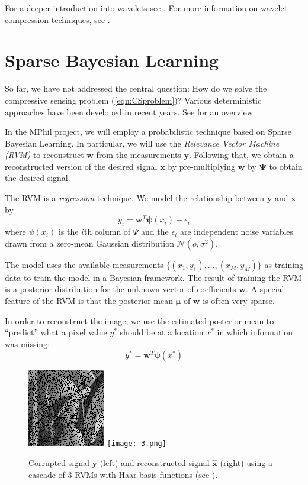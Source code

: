 \documentclass[final,3p]{report}
\let\bs\boldsymbol
\begin{document}
For a deeper introduction into wavelets see \cite{stollnitz1995}.
For more information on wavelet compression techniques, see \cite{devore1992}.

\section{Sparse Bayesian Learning}
So far, we have not addressed the central question: How do we solve the compressive sensing problem (\ref{eqn:CSproblem})?
Various deterministic approaches have been developed in recent years.
See \cite{pilikos2014} for an overview.

In the MPhil project, we will employ a probabilistic technique based on Sparse Bayesian Learning.
In particular, we will use the \emph{Relevance Vector Machine (RVM)} \cite{tipping2001,tipping2003} to reconstruct $\bs w$ from the measurements $\bs y$.
Following that, we obtain a reconstructed version of the desired signal $\bs x$ by pre-multiplying $\bs w$ by $\bs \Psi$ to obtain the desired signal.

The RVM is a \emph{regression} technique.
We model the relationship between $\bs y$ and $\bs x$ by
\begin{equation}
\label{eqn:rvmmodel}
y_i = \bs w^T \bs \psi(x_i) + \epsilon_i
\end{equation}
where $\psi(x_i)$ is the $i$th column of $\Psi$ and the $\epsilon_i$ are independent noise variables drawn from a zero-mean Gaussian distribution $\mathcal{N}(o,\sigma^2)$.

The model uses the available measurements $\{(x_1,y_1),\dots,(x_M,y_M)\}$ as training data to train the model in a Bayesian framework.
The result of training the RVM is a posterior distribution for the unknown vector of coefficients $\bs w$.
A special feature of the RVM is that the posterior mean $\bs \mu$ of $\bs w$ is often very sparse.

In order to reconstruct the image, we use the estimated posterior mean to ``predict'' what a pixel value $y^*$ should be at a location $x^*$ in which information was missing:
\begin{equation}
y^* = \bs w^T\bs\psi(x^*)
\end{equation}

\begin{figure}
\label{fig:lennareconstruction}
\center
\includegraphics{0.png}
\texttt{[image: 3.png]}
\caption{Corrupted signal $\bs y$ (left) and reconstructed signal $\hat{\bs x}$ (right) using a cascade of 3 RVMs with Haar basis functions (see \cite{pilikos2014}).}
\end{figure}
\end{document}
